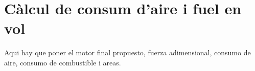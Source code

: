 \section{Càlcul de consum d’aire i fuel en vol}
Aqui hay que poner el motor final propuesto, fuerza adimensional, consumo de aire, consumo de combustible i areas. 